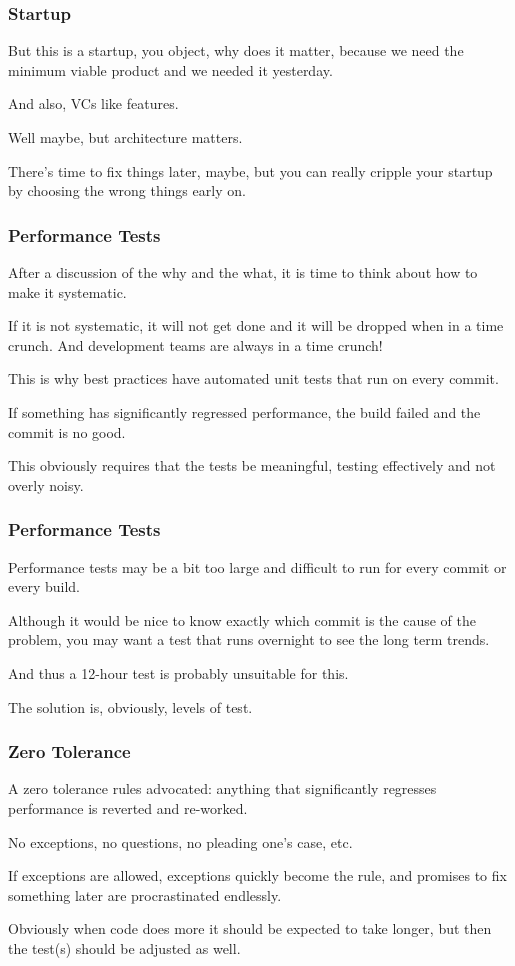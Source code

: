 \begin{frame}
\frametitle{Startup}


But this is a startup, you object, why does it matter, because we need the minimum viable product and we needed it yesterday.

And also, VCs like features. 

Well maybe, but architecture matters. 

There's time to fix things later, maybe, but you can really cripple your startup by choosing the wrong things early on. 

\end{frame}



\begin{frame}
\frametitle{Performance Tests}

After a discussion of the why and the what, it is time to think about how to make it systematic. 

If it is not systematic, it will not get done and it will be dropped when in a time crunch. And development teams are always in a time crunch! 

This is why best practices have automated unit tests that run on every commit. 

If something has significantly regressed performance, the build failed and the commit is no good. 

This obviously requires that the tests be meaningful, testing effectively and not overly noisy. 

\end{frame}



\begin{frame}
\frametitle{Performance Tests}

Performance tests may be a bit too large and difficult to run for every commit or every build. 

Although it would be nice to know exactly which commit is the cause of the problem, you may want a test that runs overnight to see the long term trends. 

And thus a 12-hour test is probably unsuitable for this. 

The solution is, obviously, levels of test. 

\end{frame}



\begin{frame}
\frametitle{Zero Tolerance}

A zero tolerance rules advocated: anything that significantly regresses performance is reverted and re-worked. 

No exceptions, no questions, no pleading one's case, etc. 

If exceptions are allowed, exceptions quickly become the rule, and promises to fix something later are procrastinated endlessly.

Obviously when code does more it should be expected to take longer, but then the test(s) should be adjusted as well.

\end{frame}



